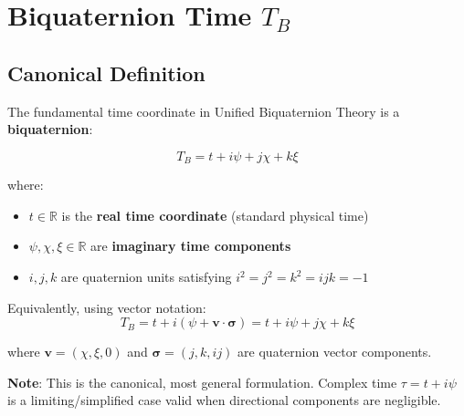

\section{Biquaternion Time $T_B$}
\label{sec:canonical:biquaternion_time}

\subsection{Canonical Definition}

The fundamental time coordinate in Unified Biquaternion Theory is a \textbf{biquaternion}:

\begin{equation}
\label{eq:canonical:biquaternion_time}
\boxed{T_B = t + i\psi + j\chi + k\xi}
\end{equation}

\noindent where:
\begin{itemize}
    \item $t \in \mathbb{R}$ is the \textbf{real time coordinate} (standard physical time)
    \item $\psi, \chi, \xi \in \mathbb{R}$ are \textbf{imaginary time components}
    \item $i, j, k$ are quaternion units satisfying $i^2 = j^2 = k^2 = ijk = -1$
\end{itemize}

Equivalently, using vector notation:
\begin{equation}
\label{eq:canonical:biquaternion_time_vector}
T_B = t + i(\psi + \mathbf{v} \cdot \boldsymbol{\sigma}) = t + i\psi + j\chi + k\xi
\end{equation}

where $\mathbf{v} = (\chi, \xi, 0)$ and $\boldsymbol{\sigma} = (j, k, ij)$ are quaternion vector components.

\textbf{Note}: This is the canonical, most general formulation. Complex time $\tau = t + i\psi$ is a limiting/simplified case valid when directional components are negligible.

